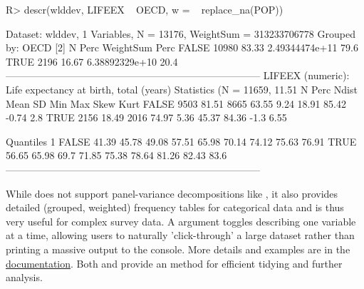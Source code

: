 \documentclass[article]{jss}
\newcommand{\fct}[1]{\code{#1()}}
\begin{document}
%
\begin{Schunk}
\begin{Sinput}
R> descr(wlddev, LIFEEX ~ OECD, w = ~ replace_na(POP))
\end{Sinput}
\begin{Soutput}
Dataset: wlddev, 1 Variables, N = 13176, WeightSum = 313233706778
Grouped by: OECD [2]
           N   Perc       WeightSum  Perc
FALSE  10980  83.33  2.49344474e+11  79.6
TRUE    2196  16.67  6.38892329e+10  20.4
-----------------------------------------------------------------------------
LIFEEX (numeric): Life expectancy at birth, total (years)
Statistics (N = 11659, 11.51% NAs)
          N   Perc  Ndist   Mean    SD    Min    Max   Skew  Kurt
FALSE  9503  81.51   8665  63.55  9.24  18.91  85.42  -0.74   2.8
TRUE   2156  18.49   2016  74.97  5.36  45.37  84.36   -1.3  6.55

Quantiles
          1%     5%    10%    25%    50%    75%    90%    95%    99%
FALSE  41.39  45.78  49.08  57.51  65.98  70.14  74.12  75.63  76.91
TRUE   56.65  65.98   69.7  71.85  75.38  78.64  81.26  82.43   83.6
-----------------------------------------------------------------------------
\end{Soutput}
\end{Schunk}

%
While \fct{descr} does not support panel-variance decompositions like \fct{qsu}, it also provides detailed (grouped, weighted) frequency tables for categorical data and is thus very useful for complex survey data. A  argument toggles describing one variable at a time, allowing users to naturally 'click-through' a large dataset rather than printing a massive output to the console. More details and examples are in the \href{https://sebkrantz.github.io/collapse/reference/descr.html}{documentation}. Both \fct{qsu} and \fct{descr} provide an  method for efficient tidying and further analysis. \newline
\end{document}
